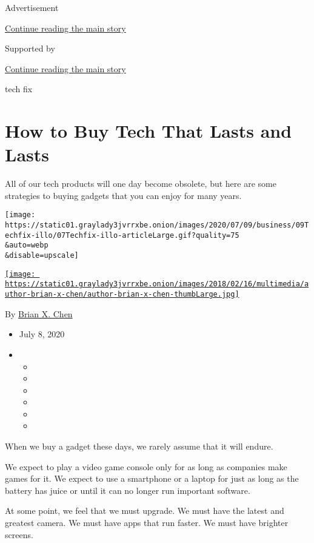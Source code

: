 Advertisement

\protect\hyperlink{after-top}{Continue reading the main story}

Supported by

\protect\hyperlink{after-sponsor}{Continue reading the main story}

tech fix

\hypertarget{how-to-buy-tech-that-lasts-and-lasts}{%
\section{How to Buy Tech That Lasts and
Lasts}\label{how-to-buy-tech-that-lasts-and-lasts}}

All of our tech products will one day become obsolete, but here are some
strategies to buying gadgets that you can enjoy for many years.

\texttt{[image: https://static01.graylady3jvrrxbe.onion/images/2020/07/09/business/09Techfix-illo/07Techfix-illo-articleLarge.gif?quality=75\\\&auto=webp\\\&disable=upscale]}

\href{https://www.nytimes3xbfgragh.onion/by/brian-x-chen}{\texttt{[image: https://static01.graylady3jvrrxbe.onion/images/2018/02/16/multimedia/author-brian-x-chen/author-brian-x-chen-thumbLarge.jpg]}}

By \href{https://www.nytimes3xbfgragh.onion/by/brian-x-chen}{Brian X.
Chen}

\begin{itemize}
\item
  July 8, 2020
\item
  \begin{itemize}
  \item
  \item
  \item
  \item
  \item
  \item
  \end{itemize}
\end{itemize}

When we buy a gadget these days, we rarely assume that it will endure.

We expect to play a video game console only for as long as companies
make games for it. We expect to use a smartphone or a laptop for just as
long as the battery has juice or until it can no longer run important
software.

At some point, we feel that we must upgrade. We must have the latest and
greatest camera. We must have apps that run faster. We must have
brighter screens.

